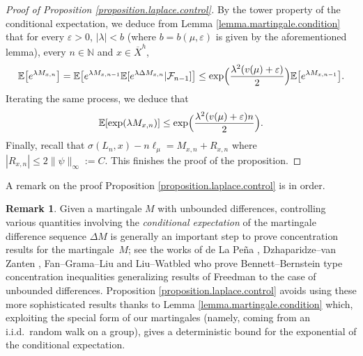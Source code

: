\documentclass[10pt]{amsart}
\let\epsilon\varepsilon
\theoremstyle{plain}
\theoremstyle{definition}
\newtheorem{remark}[theorem]{Remark}
\newcommand\E{\mathbb{E}}
\newcommand\N{\mathbb{N}}
\begin{document}
\begin{proof}[Proof of Proposition \ref{proposition.laplace.control}]
By the tower property of the conditional expectation, we deduce from Lemma \ref{lemma.martingale.condition} that for every $\epsilon>0$, $|\lambda|<b$ (where $b=b(\mu,\epsilon)$ is given by the aforementioned lemma), every $n\in \N$ and $x\in \overline{X}^h$,
\[
\E\bigl[e^{\lambda M_{x,n}}\bigr]
= \E\bigl[e^{\lambda M_{x,n-1}} \E[e^{\lambda \Delta M_{x,n}} |\mathcal{F}_{n-1}]\bigr]
\leq \exp\Bigl(\frac{\lambda^2(v(\mu)+\epsilon)}{2}\Bigr) \E\bigl[e^{\lambda M_{x,n-1}}\bigr].
\]
Iterating the same process, we deduce that
\[
\E[\exp(\lambda M_{x,n})]\leq \exp\Bigl(\frac{ \lambda^2 (v(\mu)+\epsilon) n}{2}\Bigr).
\]
Finally, recall that $\sigma(L_n,x)-n\ell_\mu=M_{x,n}+R_{x,n}$ where $|R_{x,n}|\leq 2\|\psi\|_{\infty}:=C$. This finishes the proof of the proposition.
\end{proof}

A remark on the proof Proposition \ref{proposition.laplace.control} is in order.

\begin{remark}
Given a martingale $M$ with unbounded differences, controlling various quantities involving the \emph{conditional expectation} of the martingale difference sequence $\Delta M$ is generally an important step to prove concentration results for the martingale~$M$; see the works of de La Pe\~{n}a \cite{de.la.pena}, Dzhaparidze--van Zanten \cite{DZ}, Fan--Grama--Liu \cite{fan.grama.liu} and Liu--Watbled \cite{liu-watbled} who prove Bennett--Bernstein type concentration inequalities generalizing results of Freedman \cite{Freedman} to the case of unbounded differences. Proposition \ref{proposition.laplace.control} avoids using these more sophisticated results thanks to Lemma \ref{lemma.martingale.condition} which, exploiting the special form of our martingales (namely, coming from an i.i.d.\ random walk on a group), gives a deterministic bound for the exponential of the conditional expectation.
\end{remark}
\end{document}
